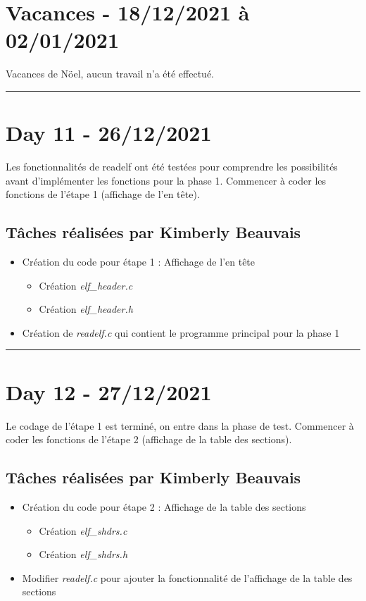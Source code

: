 \documentclass[11pt,letterpaper]{article}
\begin{document}
\section*{Vacances - 18/12/2021 à 02/01/2021}
Vacances de Nöel, aucun travail n'a été effectué.

\noindent\rule{13cm}{0.4pt}

\section*{Day 11 - 26/12/2021}
Les fonctionnalités de readelf ont été testées pour comprendre les possibilités 
avant d'implémenter les fonctions pour la phase 1. Commencer à coder les fonctions 
de l'étape 1 (affichage de l'en tête).

\subsection*{Tâches réalisées par Kimberly Beauvais}
\begin{itemize}
    \item Création du code pour étape 1 : Affichage de l'en tête
    \begin{itemize}
        \item Création \textit{elf\_header.c}
        \item Création \textit{elf\_header.h}
    \end{itemize}
    \item Création de \textit{readelf.c} qui contient le programme principal 
    pour la phase 1
\end{itemize}

\noindent\rule{13cm}{0.4pt}

\section*{Day 12 - 27/12/2021}
Le codage de l'étape 1 est terminé, on entre dans la phase de test. Commencer 
à coder les fonctions de l'étape 2 (affichage de la table des sections). 

\subsection*{Tâches réalisées par Kimberly Beauvais}
\begin{itemize}
    \item Création du code pour étape 2 : Affichage de la table des sections
    \begin{itemize}
        \item Création \textit{elf\_shdrs.c}
        \item Création \textit{elf\_shdrs.h}
    \end{itemize}
    \item Modifier \textit{readelf.c} pour ajouter la fonctionnalité 
    de l'affichage de la table des sections
\end{itemize}
\end{document}
